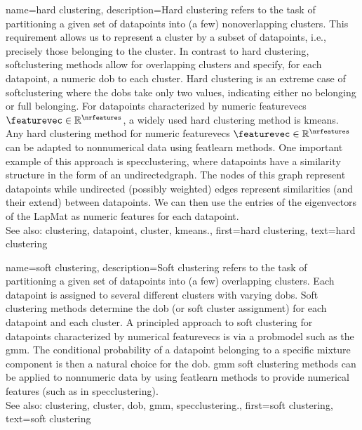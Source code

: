 {name={hard clustering}, 
	description={Hard \gls{clustering} 
		refers to the task of partitioning a given set of \glspl{datapoint} 
		into (a few) nonoverlapping \glspl{cluster}. This requirement 
		allows us to represent a \gls{cluster} by a subset of \glspl{datapoint}, 
		i.e., precisely those belonging to the \gls{cluster}. In contrast to 
		hard \gls{clustering}, \gls{softclustering} methods allow for overlapping 
		\glspl{cluster} and specify, for each \gls{datapoint}, a numeric \gls{dob} 
		to each \gls{cluster}. Hard \gls{clustering} is an extreme case of \gls{softclustering} 
		where the \glspl{dob} take only two values, indicating either no belonging or 
		full belonging. 
		For \glspl{datapoint} characterized by numeric \glspl{featurevec} $\featurevec \in \mathbb{R}^{\nrfeatures}$, 
		a widely used hard \gls{clustering} method is \gls{kmeans}. Any hard
		\gls{clustering} method for numeric \glspl{featurevec} $\featurevec \in \mathbb{R}^{\nrfeatures}$ can 
		be adapted to nonnumerical \gls{data} using \gls{featlearn} methods. 
		One important example of this approach is \gls{specclustering}, where 
		\glspl{datapoint} have a similarity structure in the form of an  
		\gls{undirectedgraph}. The nodes of this \gls{graph} represent \glspl{datapoint} 
		while undirected (possibly weighted) edges represent similarities (and their 
		extend) between \glspl{datapoint}. We can then use the entries of the 
		\glspl{eigenvector} of the \gls{LapMat} as numeric \glspl{feature} for 
		each \gls{datapoint}. 
		\\
		See also: \gls{clustering}, \gls{datapoint}, \gls{cluster}, \gls{kmeans}.},
	first={hard clustering},
	text={hard clustering} 
}
	
{name={soft clustering}, 
	description={Soft \gls{clustering} 
		refers to the task of partitioning a given set of \glspl{datapoint} into (a few) 
		overlapping \glspl{cluster}. Each \gls{datapoint} is assigned to several different 
		\glspl{cluster} with varying \glspl{dob}. Soft \gls{clustering} methods determine the 
		\gls{dob} (or soft \gls{cluster} assignment) for each \gls{datapoint} and each \gls{cluster}.
		A principled approach to soft \gls{clustering} for \glspl{datapoint} characterized by 
		numerical \glspl{featurevec} is via a \gls{probmodel} such as the \gls{gmm}. 
		The conditional \gls{probability} of a \gls{datapoint} belonging to a specific mixture 
		component is then a natural choice for the \gls{dob}. \Gls{gmm} soft \gls{clustering} 
		methods can be applied to nonnumeric \gls{data} by using \gls{featlearn} methods 
		to provide numerical \glspl{feature} (such as in \gls{specclustering}). 
				\\
		See also: \gls{clustering}, \gls{cluster}, \gls{dob}, \gls{gmm}, \gls{specclustering}.},
	first={soft clustering},
	text={soft clustering} 
}

